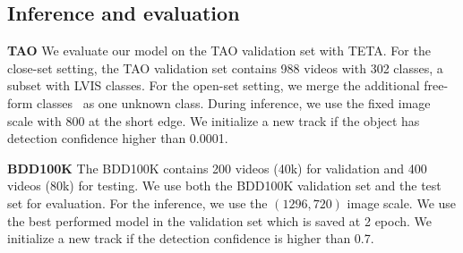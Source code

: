 \documentclass[runningheads]{llncs}
\newcommand{\parsection}[1]{\vspace{1mm}\noindent\textbf{#1 }}
\begin{document}
\subsection{Inference and evaluation}

\parsection{TAO}
We evaluate our model on the TAO validation set with TETA. For the close-set setting, the TAO validation set contains 988 videos with 302 classes, a subset with LVIS classes. For the open-set setting, we merge the additional free-form classes~\cite{tao} as one unknown class. During inference, we use the fixed image scale with 800 at the short edge. We initialize a new track if the object has detection confidence higher than 0.0001.  

\parsection{BDD100K}
The BDD100K contains 200 videos (40k) for validation and 400 videos (80k) for testing. We use both the BDD100K validation set and the test set for evaluation. For the inference, we use the $(1296, 720)$ image scale. We use the best performed model in the validation set which is saved at 2 epoch. We initialize a new track if the detection confidence is higher than 0.7. 




\end{document}
